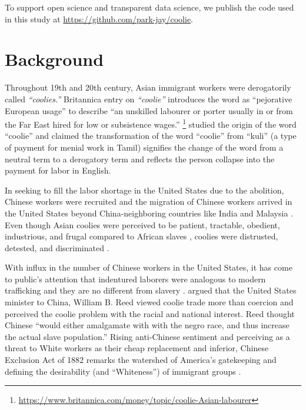 \documentclass[11pt]{article}
\begin{document}
To support open science and transparent data science, we publish the code used in this study at 
\url{https://github.com/park-jay/coolie}.

\section{Background} \label{sec:background}

Throughout 19th and 20th century, Asian immigrant workers were derogatorily called \textit{``coolies.''}
Britannica entry on \textit{``coolie''} introduces the word as ``pejorative European usage'' to 
describe ``an unskilled labourer or porter usually in or from the Far East hired for low
or subsistence wages.'' \footnote{\url{https://www.britannica.com/money/topic/coolie-Asian-labourer}}
\citet{breman1992conclusion} studied the origin of the word ``coolie''
and claimed the transformation of the word ``coolie'' from ``kuli'' 
(a type of payment for menial work in Tamil) 
signifies the change of the word from a neutral term to a derogatory term
and reflects the person collapse into the payment for labor in English.

In seeking to fill the labor shortage in the United States due to the
abolition, Chinese workers were recruited and the migration of Chinese workers arrived in the United States
beyond China-neighboring countries like India and Malaysia \cite{farley1968chinese}.
Even though Asian coolies were perceived to be 
patient, tractable, obedient, industrious, and
frugal compared to African slaves \cite{jung2006coolies}, 
coolies were distrusted, detested, and discriminated \cite{breman2023coolie}.

With influx in the number of Chinese workers in the United States,
it has come to public's attention that indentured laborers 
were analogous to modern trafficking and they are no different from
slavery \cite{kempadoo2017bound}.
\citet{jung2006coolies} argued that the United States minister to China, 
William B. Reed viewed coolie trade more than coercion and perceived the coolie problem
with the racial and national interest. Reed thought Chinese ``would either amalgamate with
with the negro race, and thus increase the actual slave population.''
Rising anti-Chinese sentiment and perceiving as a threat to White workers as their cheap replacement \cite{rhoads2002white}
and inferior, Chinese Exclusion Act of 1882 remarks the watershed of America's gatekeeping
and defining the desirability (and ``Whiteness'') of immigrant groups \cite{lee2002chinese}.
\end{document}
